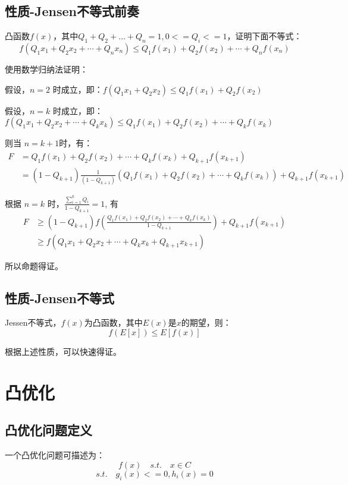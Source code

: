 \documentclass[12pt]{article}
\begin{document}
\subsection{性质-Jensen不等式前奏}
凸函数$f(x)$，其中$Q_1+Q_2+…+Q_n=1,0<= Q_i<=1$，证明下面不等式：
$$
f(Q_1x_1 + Q_2x_2 + \cdots + Q_nx_n) \le Q_1f(x_1) + Q_2f(x_2) + \cdots + Q_nf(x_n)
$$

\begin{framed}  
\small{
使用数学归纳法证明：

假设，$n=2$ 时成立，即：$f(Q_1x_1 + Q_2x_2) \le Q_1f(x_1) + Q_2f(x_2)$

假设，$n=k$ 时成立，即：$f(Q_1x_1 + Q_2x_2 + \cdots + Q_kx_k) \le Q_1f(x_1) + Q_2f(x_2) + \cdots + Q_kf(x_k)$


则当 $n=k+1$时，有：
\begin{align*}
F &= Q_1f(x_1) + Q_2f(x_2) + \cdots + Q_kf(x_k) +  Q_{k+1}f(x_{k+1}) \\
  &= (1-Q_{k+1})\frac{1}{(1-Q_{k+1})}(Q_1f(x_1) + Q_2f(x_2) + \cdots + Q_kf(x_k)) + Q_{k+1}f(x_{k+1})
\end{align*}

根据 $n=k$ 时，$\frac{\sum_{i=1}^kQ_i}{1-Q_{k+1}} = 1$, 有
\begin{align*}
    F &\ge (1-Q_{k+1})f(\frac{Q_1f(x_1) + Q_2f(x_2) + \cdots + Q_kf(x_k)}{1-Q_{k+1}}) + Q_{k+1}f(x_{k+1}) \\
  &\ge f(Q_1x_1 + Q_2x_2 + \cdots + Q_kx_k + Q_{k+1}x_{k+1})
\end{align*}

所以命题得证。
}
\end{framed}

\subsection{性质-Jensen不等式}
Jessen不等式，$f(x)$为凸函数，其中$E(x)$是$x$的期望，则：
$$
f(E[x]) \le E[f(x)]
$$

\begin{framed}  
\small{
根据上述性质，可以快速得证。
}
\end{framed}

\section{凸优化}
\subsection{凸优化问题定义}
一个凸优化问题可描述为：
$$
f(x) \quad s.t. \quad x\in C
$$
$$
s.t. \quad g_i(x) <= 0, h_i(x) = 0
$$
\end{document}

